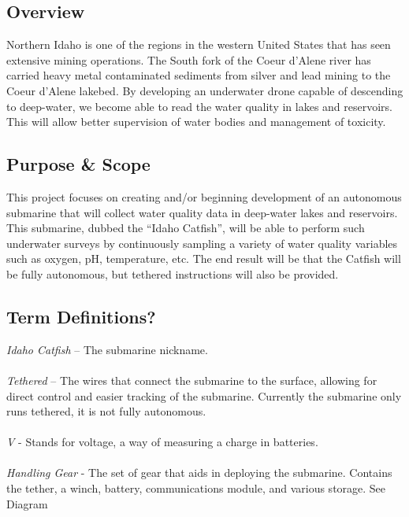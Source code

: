 \documentclass[
10pt, %
a4paper, %
oneside, %
headinclude,footinclude, %
BCOR5mm, %
]{scrartcl}
\begin{document}
\subsection*{Overview}

Northern Idaho is one of the regions in the western United States that has seen extensive mining operations. The South fork of the Coeur d’Alene river has carried heavy metal contaminated sediments from silver and lead mining to the Coeur d’Alene lakebed. By developing an underwater drone capable of descending to deep-water, we become able to read the water quality in lakes and reservoirs. This will allow better supervision of water bodies and management of toxicity.

\subsection*{Purpose \& Scope}

This project focuses on creating and/or beginning development of an autonomous submarine that will collect water quality data in deep-water lakes and reservoirs. This submarine, dubbed the “Idaho Catfish”, will be able to perform such underwater surveys by continuously sampling a variety of water quality variables such as oxygen, pH, temperature, etc. The end result will be that the Catfish will be fully autonomous, but tethered instructions will also be provided.

\subsection*{Term Definitions?}

\textit{Idaho Catfish }  – The submarine nickname. \\ \\
\textit{Tethered } – The wires that connect the submarine to the surface, allowing for direct control and easier tracking of the submarine. Currently the submarine only runs tethered, it is not fully autonomous. \\ \\
\textit{ V } - Stands for voltage, a way of measuring a charge in batteries. \\ \\
\textit{Handling Gear} - The set of gear that aids in deploying the submarine. Contains the tether, a winch, battery, communications module, and various storage. See Diagram \\ \\
\end{document}
